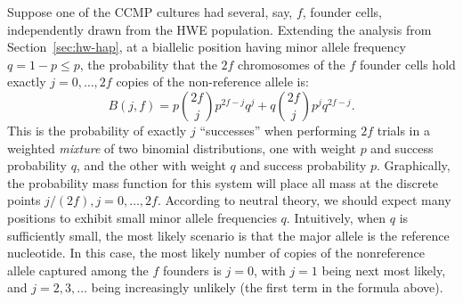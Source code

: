 \documentclass{article}\usepackage[]{graphicx}\usepackage[]{color}
\begin{document}



Suppose one of the CCMP cultures had several, say, $f$, founder cells, independently drawn
from the HWE population.  
Extending the analysis from Section~\ref{sec:hw-hap}, at a biallelic position having minor allele
frequency $q = 1-p \le p$, the probability that the $2f$ chromosomes of the $f$ founder cells hold
exactly $j = 0, \ldots, 2f$ copies of the non-reference allele is:
$$
  B(j,f) = p {{2f}\choose{j}} p^{2f-j} q^j + q {{2f}\choose{j}} p^j q^{2f-j} .
$$
This is the probability of exactly $j$ ``successes'' when performing $2f$ trials in a weighted \emph{mixture} of two binomial distributions, one with weight $p$ and success probability $q$, and the other with weight $q$ and success probability $p$.  Graphically, the probability mass function for this system will place all mass at the discrete points $j/(2f), j=0,\ldots,2f$.  
According to neutral theory, we should expect many positions to exhibit small minor allele frequencies $q$.
Intuitively, when $q$ is sufficiently small, the most likely scenario is that the major allele is the reference nucleotide.
In this case, the most likely number of copies of the nonreference allele captured among the $f$ founders is $j=0$, with $j=1$ being next most likely, and $j=2,3,\ldots$ being increasingly unlikely (the first term in the formula above).
\end{document}
